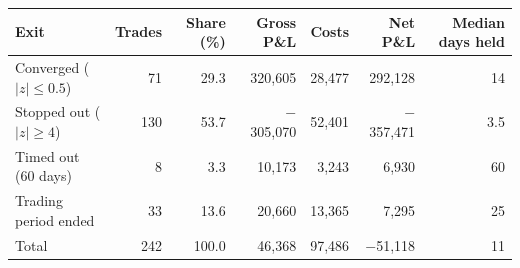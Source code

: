 \begin{tabular}{@{}lrrrrrr@{}}
\toprule
Exit & Trades & Share (\%) & Gross P\&L & Costs & Net P\&L & Median days held \\
\midrule
Converged ($|z| \le 0.5$) & 71 & 29.3 & 320,605 & 28,477 & 292,128 & 14 \\
Stopped out ($|z| \ge 4$) & 130 & 53.7 & \ensuremath{-}305,070 & 52,401 & \ensuremath{-}357,471 & 3.5 \\
Timed out (60 days) & 8 & 3.3 & 10,173 & 3,243 & 6,930 & 60 \\
Trading period ended & 33 & 13.6 & 20,660 & 13,365 & 7,295 & 25 \\
\midrule Total & 242 & 100.0 & 46,368 & 97,486 & \ensuremath{-}51,118 & 11 \\
\bottomrule
\end{tabular}
